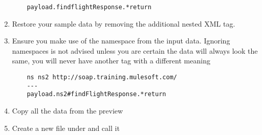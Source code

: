 \begin{enumerate}[resume*]
  \begin{verbatim}
    payload.findflightResponse.*return
  \end{verbatim}
\item Restore your sample data by removing the additional nested  XML tag.
\item Ensure you make use of the namespace from the input data.  Ignoring namespaces is not advised unless you are certain the data will always look the same, you will never have another  tag with a different meaning
  \begin{verbatim}
    ns ns2 http://soap.training.mulesoft.com/
    ---
    payload.ns2#findFlightResponse.*return
  \end{verbatim}
\item Copy all the data from the preview
\item Create a new file under  and call it 
\end{enumerate}


